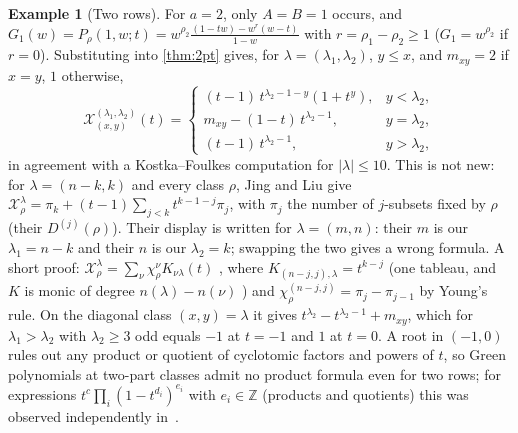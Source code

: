 \documentclass[11pt]{amsart}
\theoremstyle{definition}
\newtheorem{example}[theorem]{Example}
\theoremstyle{remark}
\numberwithin{equation}{section}
\begin{document}
\begin{example}[Two rows]\label{ex:tworow}
For $a=2$, only $A=B=1$ occurs, and $G_1(w)=P_\rho(1,w;t)=w^{\rho_2}\frac{(1-tw)-w^r(w-t)}{1-w}$ with $r=\rho_1-\rho_2\ge1$ ($G_1=w^{\rho_2}$ if $r=0$). Substituting into \cref{thm:2pt} gives, for $\lambda=(\lambda_1,\lambda_2)$, $y\le x$, and $m_{xy}=2$ if $x=y$, $1$ otherwise,
\[ \mathcal X^{(\lambda_1,\lambda_2)}_{(x,y)}(t)=\begin{cases}(t-1)\,t^{\lambda_2-1-y}(1+t^{y}), & y<\lambda_2,\\ m_{xy}-(1-t)\,t^{\lambda_2-1}, & y=\lambda_2,\\ (t-1)\,t^{\lambda_2-1}, & y>\lambda_2,\end{cases} \]
in agreement with a Kostka--Foulkes computation for $|\lambda|\le10$. This is not new: for $\lambda=(n-k,k)$ and every class $\rho$, Jing and Liu \cite[Thm.~2.6, unnumbered display after (2.32), same in v1 and v2]{JingLiu21} give $\mathcal X^\lambda_\rho=\pi_k+(t-1)\sum_{j<k}t^{k-1-j}\pi_j$, with $\pi_j$ the number of $j$-subsets fixed by $\rho$ (their $D^{(j)}(\rho)$). Their display is written for $\lambda=(m,n)$: their $m$ is our $\lambda_1=n-k$ and their $n$ is our $\lambda_2=k$; swapping the two gives a wrong formula. A short proof: $\mathcal X^\lambda_\rho=\sum_\nu\chi^\nu_\rho K_{\nu\lambda}(t)$ \cite[III (7.6$'$)]{Macdonald95}, where $K_{(n-j,j),\lambda}=t^{k-j}$ (one tableau, and $K$ is monic of degree $n(\lambda)-n(\nu)$ \cite[III (6.5)]{Macdonald95}) and $\chi^{(n-j,j)}_\rho=\pi_j-\pi_{j-1}$ by Young's rule. On the diagonal class $(x,y)=\lambda$ it gives $t^{\lambda_2}-t^{\lambda_2-1}+m_{xy}$, which for $\lambda_1>\lambda_2$ with $\lambda_2\ge3$ odd equals $-1$ at $t=-1$ and $1$ at $t=0$. A root in $(-1,0)$ rules out any product or quotient of cyclotomic factors and powers of $t$, so Green polynomials at two-part classes admit no product formula even for two rows; for expressions $t^c\prod_i(1-t^{d_i})^{e_i}$ with $e_i\in\mathbb{Z}$ (products and quotients) this was observed independently in~\cite[Thm.~D]{Clio26}.
\end{example}
\end{document}
